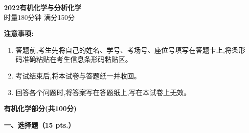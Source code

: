 \begin{center}
    {\LARGE \textbf{2022有机化学与分析化学}} \\[2ex]
    {\large 时量180分钟 \quad 满分150分}
\end{center}

\vspace{0.5cm}
\noindent\textbf{注意事项:}
\begin{enumerate}[label=\arabic*., parsep=0pt, itemsep=0pt]
    \item 答题前,考生先将自己的姓名、学号、考场号、座位号填写在答题卡上,将条形码准确粘贴在考生信息条形码粘贴区。
    \item 考试结束后,将本试卷与答题纸一并收回。
    \item 回答各个问题时,将答案写在答题纸上,写在本试卷上无效。
\end{enumerate}

\vspace{1cm}
\begin{center}
    {\Large \textbf{有机化学部分(共100分)}}
\end{center}

\vspace{0.5cm}
\noindent\textbf{一、选择题（15 pts.）}

